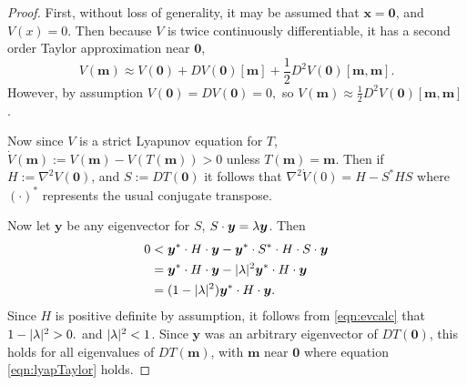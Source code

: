 \begin{proof}
	First, without loss of generality, it may be assumed that \( \bm x =\bm 0 \), and \( V(x)=0 \). Then because \( V \) is twice continuously differentiable, it has a second order Taylor approximation near  \( \bm 0 \),
	\begin{equation}\label{eqn:lyapTaylor}
	 V(\bm m) \approx V(\bm 0)+DV(\bm 0)[\bm m] +\frac 12 D^2V(\bm 0)[\bm m, \bm m].
	\end{equation}
	However, by assumption \( V(\bm 0) = DV(\bm 0) = 0, \) so \( V(\bm m) \approx \frac 12 D^2V(\bm 0)[\bm m, \bm m] \).
	
	Now since \( V \) is a strict Lyapunov equation for \( T \), \( \dot{V}(\bm m) := V(\bm m) - V(T(\bm m))> 0 \) unless \( T(\bm m)= \bm m \). Then if \( H := \nabla^2 V(\bm 0) \), and \( S:= DT(\bm 0) \) it follows that \( \nabla^2\dot{V}(0) = H-S^{\ast}HS \) where \( (\cdot)^{\ast} \) represents the usual conjugate transpose.  
	
	Now let \( \bm y \) be any eigenvector for \( S \), \( S\cdot\bm y =\lambda \bm y \). Then
	\begin{align}
	0&<\bm y^{\ast}\cdot H\cdot\bm y -\bm y^{\ast}\cdot S^{\ast}\cdot H\cdot S\cdot \bm y\\
	 &= \bm y^{\ast}\cdot H\cdot\bm y - |\lambda|^2\bm y^{\ast}\cdot H\cdot\bm y\\
	 &= (1-|\lambda|^2) \bm y^{\ast}\cdot H\cdot\bm y. \label{eqn:evcalc}
	\end{align} 
	Since \( H \) is positive definite by assumption, it follows from \eqref{eqn:evcalc} that \( 1-|\lambda|^2>0. \) and \( |\lambda|^2<1 \). Since \(\bm y \) was an arbitrary eigenvector of \( DT(\bm 0) \), this holds for all eigenvalues of \( DT(\bm m) \), with \( \bm m \) near \( \bm 0 \) where equation \eqref{eqn:lyapTaylor} holds.
	
\end{proof}

